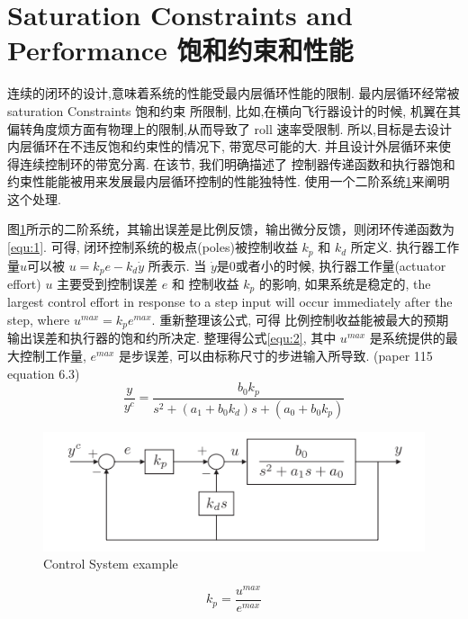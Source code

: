 \documentclass[UTF8,a4paper,10pt,nocolorlinks]{ctexart}
\begin{document}
    \section{Saturation Constraints and Performance 饱和约束和性能}
    连续的闭环的设计,意味着系统的性能受最内层循环性能的限制. 最内层循环经常被 saturation Constraints 饱和约束 所限制,  
    比如,在横向飞行器设计的时候, 机翼在其偏转角度烦方面有物理上的限制,从而导致了 roll 速率受限制. 
    所以,目标是去设计内层循环在不违反饱和约束性的情况下, 带宽尽可能的大. 并且设计外层循环来使得连续控制环的带宽分离. 
    在该节, 我们明确描述了 控制器传递函数和执行器饱和约束性能能被用来发展最内层循环控制的性能独特性. 
    使用一个二阶系统\ref{fig:6:5}来阐明这个处理.
    \par
    图\ref{fig:6:5}所示的二阶系统，其输出误差是比例反馈，输出微分反馈，则闭环传递函数为\ref{equ:1}. 可得, 闭环控制系统的极点(poles)被控制收益 $k_{p}$ 和 $k_{d}$ 所定义. 执行器工作量$u$可以被 $u = k_{p}e - k_{d}\dot{y}$ 所表示. 当 $\dot{y}$是0或者小的时候, 执行器工作量(actuator effort) $u$ 主要受到控制误差 $e$ 和 控制收益 $k_{p}$ 的影响, 如果系统是稳定的, the largest control effort in response to a step input will occur immediately after the step, where $u^{max} = k_{p}e^{max}$. 重新整理该公式,  可得 比例控制收益能被最大的预期输出误差和执行器的饱和约所决定. 整理得公式\ref{equ:2}, 其中 $u^{max}$ 是系统提供的最大控制工作量, $e^{max}$ 是步误差, 可以由标称尺寸的步进输入所导致. (paper 115 equation 6.3)
    \begin{equation}
        \frac{y}{y^{c}} = \frac{b_{0}k_{p}}{s^{2} + (a_{1} + b_{0}k_{d})s + (a_{0} + b_{0}k_{p})}
        \label{equ:1}
    \end{equation}
    \begin{figure}[H]
        \centering %
        \includegraphics[width=\textwidth]{pictures/6_5.png} 
        \caption{Control System example}
        \label{fig:6:5}
    \end{figure}

    \begin{equation}
        k_{p} = \frac{u^{max}}{e^{max}}
        \label{equ:2}
    \end{equation}
\end{document}
